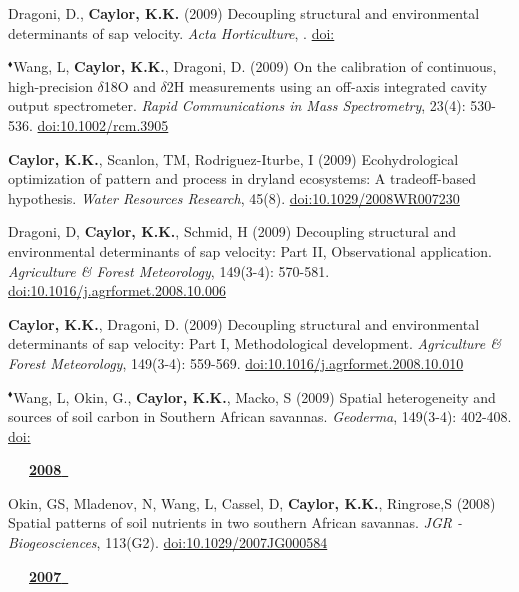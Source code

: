 \begin{etaremune}
\item Dragoni, D., \textbf{ Caylor, K.K.} (2009) Decoupling structural and environmental determinants of sap velocity. \emph{Acta Horticulture}, . \href{https://doi.org/}{doi:}
\item $^{\blacklozenge}$Wang, L, \textbf{ Caylor, K.K.}, Dragoni, D. (2009) On the calibration of continuous, high-precision $\delta$18O and $\delta$2H measurements using an off-axis integrated cavity output spectrometer. \emph{Rapid Communications in Mass Spectrometry}, 23(4): 530-536. \href{https://doi.org/10.1002/rcm.3905}{doi:10.1002/rcm.3905}
\item \textbf{ Caylor, K.K.}, Scanlon, TM, Rodriguez-Iturbe, I (2009) Ecohydrological optimization of pattern and process in dryland ecosystems: A tradeoff-based hypothesis. \emph{Water Resources Research}, 45(8). \href{https://doi.org/10.1029/2008WR007230}{doi:10.1029/2008WR007230}
\item Dragoni, D, \textbf{ Caylor, K.K.}, Schmid, H (2009) Decoupling structural and environmental determinants of sap velocity: Part II, Observational application. \emph{Agriculture \& Forest Meteorology}, 149(3-4): 570-581. \href{https://doi.org/10.1016/j.agrformet.2008.10.006}{doi:10.1016/j.agrformet.2008.10.006}
\item \textbf{ Caylor, K.K.}, Dragoni, D. (2009) Decoupling structural and environmental determinants of sap velocity: Part I, Methodological development. \emph{Agriculture \& Forest Meteorology}, 149(3-4): 559-569. \href{https://doi.org/10.1016/j.agrformet.2008.10.010}{doi:10.1016/j.agrformet.2008.10.010}
\item $^{\blacklozenge}$Wang, L, Okin, G., \textbf{ Caylor, K.K.}, Macko, S (2009) Spatial heterogeneity and sources of soil carbon in Southern African savannas. \emph{Geoderma}, 149(3-4): 402-408. \href{https://doi.org/}{doi:}

\vspace{0.1in}
\mbox{\ \ \ \underline{\textbf{2008 }}}
\vspace{0.1in}

\item Okin, GS, Mladenov, N, Wang, L, Cassel, D, \textbf{ Caylor, K.K.}, Ringrose,S (2008) Spatial patterns of soil nutrients in two southern African savannas. \emph{JGR - Biogeosciences}, 113(G2). \href{https://doi.org/10.1029/2007JG000584}{doi:10.1029/2007JG000584}

\vspace{0.1in}
\mbox{\ \ \ \underline{\textbf{2007 }}}
\vspace{0.1in}


\end{etaremune}
